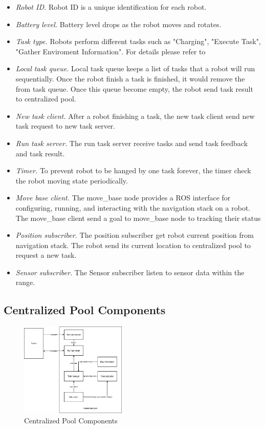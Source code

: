 \begin{itemize}
	\item \textsl{Robot ID.} Robot ID is a unique identification for each robot.
	\item \textsl{Battery level.} Battery level drops as the robot moves and rotates.
	\item \textsl{Task type.} Robots perform different tasks such as "Charging", "Execute Task", "Gather Enviroment Information". For details please refer to 
	\item \textsl{Local task queue.} Local task queue keeps a list of tasks that a robot will run sequentially. Once the robot finish a task is finished, it would remove the from task queue. Once this queue become empty, the robot send task result to centralized pool.
	\item \textsl{New task client.} After a robot finishing a task, the new task client send new task request to new task server.
	\item \textsl{Run task server.} The run task server receive tasks and send task feedback and task result.
	\item \textsl{Timer.} To prevent robot to be hanged by one task forever, the timer check the robot moving state periodically.
	\item \textsl{Move base client.} The move\_base node provides a ROS interface for configuring, running, and interacting with the navigation stack on a robot. The move\_base client send a goal to move\_base node to tracking their status  
	\item \textsl{Position subscriber.} The position subscriber get robot current position from navigation stack. The robot send its current location to centralized pool to request a new task.
	\item \textsl{Sensor subscriber.} The Sensor subscriber listen to sensor data within the range.
\end{itemize}

\subsection{Centralized Pool Components}

\begin{figure}[htb]
	\centering
	\includegraphics[width = 0.45\textwidth]{content/images/ch3/system_component_centralized_pool.drawio.png}
	\caption{Centralized Pool Components}
	\label{fig:centralized_pool_components}
\end{figure}

